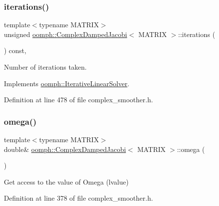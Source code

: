 \subsubsection{\texorpdfstring{iterations()}{iterations()}}
{\footnotesize\ttfamily template$<$typename M\+A\+T\+R\+IX$>$ \\
unsigned \hyperlink{classoomph_1_1ComplexDampedJacobi}{oomph\+::\+Complex\+Damped\+Jacobi}$<$ M\+A\+T\+R\+IX $>$\+::iterations (\begin{DoxyParamCaption}{ }\end{DoxyParamCaption}) const\hspace{0.3cm}{\ttfamily [inline]}, {\ttfamily [virtual]}}



Number of iterations taken. 



Implements \hyperlink{classoomph_1_1IterativeLinearSolver_a5fe7f7b5e4847fdbd4f95d3875ec7a46}{oomph\+::\+Iterative\+Linear\+Solver}.



Definition at line 478 of file complex\+\_\+smoother.\+h.

\mbox{\label{classoomph_1_1ComplexDampedJacobi_a7132c319d14c6d3c6aac8ac0536af801}} 
\subsubsection{\texorpdfstring{omega()}{omega()}}
{\footnotesize\ttfamily template$<$typename M\+A\+T\+R\+IX$>$ \\
double\& \hyperlink{classoomph_1_1ComplexDampedJacobi}{oomph\+::\+Complex\+Damped\+Jacobi}$<$ M\+A\+T\+R\+IX $>$\+::omega (\begin{DoxyParamCaption}{ }\end{DoxyParamCaption})\hspace{0.3cm}{\ttfamily [inline]}}



Get access to the value of Omega (lvalue) 



Definition at line 378 of file complex\+\_\+smoother.\+h.

\mbox{\label{classoomph_1_1ComplexDampedJacobi_abff6e2acd7cf7b7bb3a82612f9404460}} 
